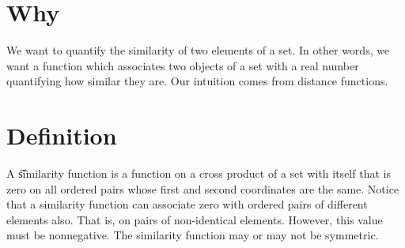 

\section*{Why}

We want to quantify the similarity of two elements of a set.
In other words, we want a function which associates two objects of a set with a real number quantifying how similar they are.
Our intuition comes from distance functions.

\section*{Definition}

A \t{similarity function} is a function on a cross product of a set with itself that is zero on all ordered pairs whose first and second coordinates are the same.
Notice that a similarity function can associate zero with ordered pairs of different elements also.
That is, on pairs of non-identical elements.
However, this value must be nonnegative.
The similarity function may or may not be symmetric.

\blankpage